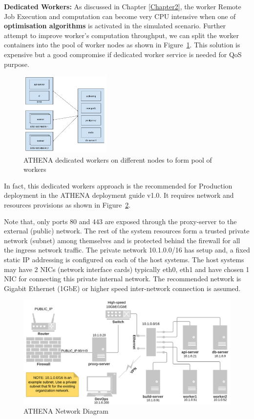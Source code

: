 \noindent \textbf{Dedicated Workers:} \quad As discussed in Chapter \ref{Chapter2}, the worker Remote Job Execution and computation can become very CPU intensive when one of  \textbf{optimisation algorithms} is activated in the simulated scenario. Further attempt to improve worker's computation throughput, we can split the worker containers into the pool of worker nodes as shown in Figure~\ref{fig:dedicatedWorkers}. This solution is expensive but a good compromise if dedicated worker service is needed for QoS purpose.

\begin{figure}[H]
\centering
\includegraphics[width=0.4\textwidth]{Figures/ATHENA_dedicated_workers}
\decoRule
\caption[ATHENA Dedicated Workers]{ATHENA dedicated workers on different nodes to form pool of workers}
\label{fig:dedicatedWorkers}
\end{figure}

In fact, this dedicated workers approach is the recommended for Production deployment in the ATHENA deployment guide v1.0\parencite{athenaAllDoc}. It requires network and resources provisions as shown in Figure~\ref{fig:deployNetwork}. 

Note that, only ports 80 and 443 are exposed through the proxy-server to the external (public) network. The rest of the system resources form a trusted private network (subnet) among themselves and is protected behind the firewall for all the ingress network traffic. The private network 10.1.0.0/16 has setup and, a fixed static IP addressing is configured on each of the host systems. The host systems may have 2 NICs (network interface cards) typically eth0, eth1 and have chosen 1 NIC for connecting this private internal network. The recommended network is Gigabit Ethernet (1GbE) or higher speed inter-network connection is assumed.

\begin{figure}[H]
\centering
\includegraphics[width=0.7\paperwidth]{Figures/ATHENA_deploy_network_diagram}
\decoRule
\caption[ATHENA Network Diagram]{ATHENA Network Diagram}
\label{fig:deployNetwork}
\end{figure}

